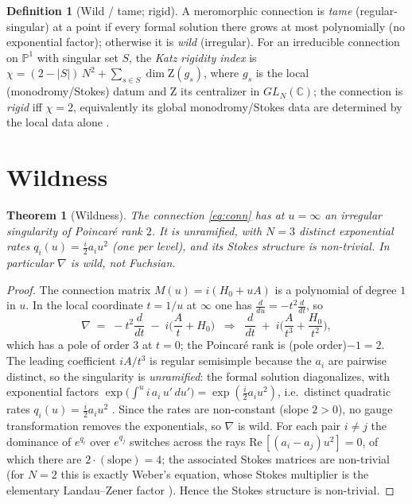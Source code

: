 \documentclass[11pt]{article}
\newtheorem{theorem}{Theorem}
\theoremstyle{definition}
\newtheorem{definition}{Definition}
\newcommand{\C}{\mathbb{C}}
\newcommand{\PP}{\mathbb{P}^1}
\newcommand{\Stab}{\mathrm{Z}}
\begin{document}
\begin{definition}[Wild / tame; rigid]\label{def:terms}
A meromorphic connection is \emph{tame} (regular-singular) at a point if every formal solution there grows at
most polynomially (no exponential factor); otherwise it is \emph{wild} (irregular). For an irreducible
connection on $\PP$ with singular set $S$, the \emph{Katz rigidity index} is
$\chi=(2-|S|)\,N^2+\sum_{s\in S}\dim \Stab(g_s)$, where $g_s$ is the local (monodromy/Stokes) datum and
$\Stab$ its centralizer in $GL_N(\C)$; the connection is \emph{rigid} iff $\chi=2$, equivalently its global
monodromy/Stokes data are determined by the local data alone \cite{Katz}.
\end{definition}

\section{Wildness}\label{sec:wild}

\begin{theorem}[Wildness]\label{thm:wild}
The connection \eqref{eq:conn} has at $u=\infty$ an irregular singularity of Poincar\'e rank $2$. It is
\emph{unramified}, with $N{=}3$ distinct exponential rates $q_i(u)=\tfrac{i}{2}a_i u^2$ (one per level), and
its Stokes structure is non-trivial. In particular $\nabla$ is wild, not Fuchsian.
\end{theorem}

\begin{proof}
The connection matrix $M(u)=i(H_0+uA)$ is a polynomial of degree $1$ in $u$. In the local coordinate $t=1/u$
at $\infty$ one has $\tfrac{d}{du}=-t^2\tfrac{d}{dt}$, so
\[
\nabla \;=\; -t^2\frac{d}{dt}\;-\;i\Big(\frac{A}{t}+H_0\Big)
\;\;\Longrightarrow\;\;
\frac{d}{dt}\;+\;i\Big(\frac{A}{t^{3}}+\frac{H_0}{t^{2}}\Big),
\]
which has a pole of order $3$ at $t=0$; the Poincar\'e rank is (pole order)$-1=2$. The leading coefficient
$iA/t^3$ is regular semisimple because the $a_i$ are pairwise distinct, so the singularity is
\emph{unramified}: the formal solution diagonalizes, with exponential factors
$\exp\!\big(\int^{u} i\,a_i\,u'\,du'\big)=\exp(\tfrac{i}{2}a_i u^2)$, i.e.\ distinct quadratic rates
$q_i(u)=\tfrac{i}{2}a_i u^2$ \cite{Wasow}. Since the rates are non-constant (slope $2>0$), no gauge
transformation removes the exponentials, so $\nabla$ is wild. For each pair $i\neq j$ the dominance of
$e^{q_i}$ over $e^{q_j}$ switches across the rays $\mathrm{Re}\,[(a_i-a_j)u^2]=0$, of which there are
$2\cdot(\text{slope})=4$; the associated Stokes matrices are non-trivial (for $N{=}2$ this is exactly Weber's
equation, whose Stokes multiplier is the elementary Landau--Zener factor \cite{JMU}). Hence the Stokes
structure is non-trivial.
\end{proof}
\end{document}
